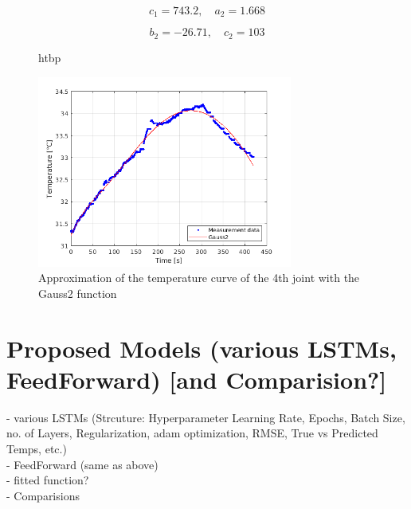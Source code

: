 \documentclass{ifacconf}
\begin{document}
\[
c_1 = 743.2, \quad a_2 = 1.668 
\]

\[
b_2 = -26.71, \quad c_2 = 103
\]
\begin{figure}{htbp}
  \begin{center}
  \includegraphics[width=8.4cm]{pictures/Gauss2_legend.png}    %
  \caption{Approximation of the temperature curve of the 4th joint with the Gauss2 function} 
  \label{fig:Gauss2_legend}
  \end{center}
\end{figure}






\section{Proposed Models (various LSTMs, FeedForward) [and Comparision?]}
- various LSTMs (Strcuture: Hyperparameter {Learning Rate, Epochs, Batch Size, no. of Layers, Regularization, adam optimization}, RMSE, True vs Predicted Temps, etc.)\\
- FeedForward (same as above)\\
- fitted function?\\
- Comparisions
\end{document}
